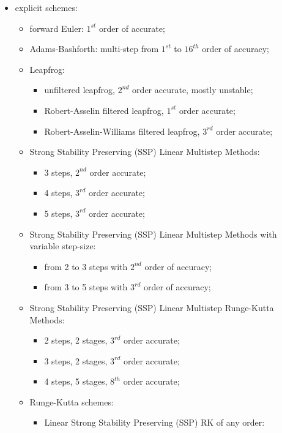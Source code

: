 \begin{itemize}
   \item explicit schemes:
   \begin{itemize}
      \item forward Euler: $1^{st}$ order of accurate;
      \item Adams-Bashforth: multi-step from $1^{st}$ to $16^{th}$ order of accuracy;
      \item Leapfrog:
      \begin{itemize}
         \item unfiltered leapfrog, $2^{nd}$ order accurate, mostly unstable;
         \item Robert-Asselin filtered leapfrog, $1^{st}$ order accurate;
         \item Robert-Asselin-Williams filtered leapfrog, $3^{rd}$ order accurate;
      \end{itemize}
      \item Strong Stability Preserving (SSP) Linear Multistep Methods:
      \begin{itemize}
         \item 3 steps, $2^{nd}$ order accurate;
         \item 4 steps, $3^{rd}$ order accurate;
         \item 5 steps, $3^{rd}$ order accurate;
      \end{itemize}
      \item Strong Stability Preserving (SSP) Linear Multistep Methods with variable step-size:
      \begin{itemize}
         \item from 2 to 3 steps with $2^{nd}$ order of accuracy;
         \item from 3 to 5 steps with $3^{rd}$ order of accuracy;
      \end{itemize}
      \item Strong Stability Preserving (SSP) Linear Multistep Runge-Kutta Methods:
      \begin{itemize}
         \item 2 steps, 2 stages, $3^{rd}$ order accurate;
         \item 3 steps, 2 stages, $3^{rd}$ order accurate;
         \item 4 steps, 5 stages, $8^{th}$ order accurate;
      \end{itemize}
      \item Runge-Kutta schemes:
      \begin{itemize}
         \item Linear Strong Stability Preserving (SSP) RK of any order:

\end{itemize}
\end{itemize}
\end{itemize}
